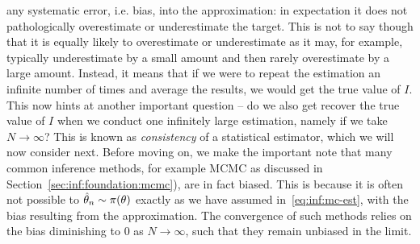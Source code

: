 any systematic error, i.e. bias, into the approximation: in expectation it does not
pathologically overestimate or underestimate the target.  This is not to say though that it is
equally likely to overestimate or underestimate as it may, for example, typically underestimate
by a small amount and then rarely overestimate by a large amount.  Instead, it means that if we
were to repeat the estimation an infinite number of times and average the results, we would
get the true value of $I$.  This now hints at another important question -- do we also get
recover the true value of $I$ when we conduct one infinitely large estimation, namely if we
take $N\rightarrow\infty$?  This is known as \emph{consistency} of a statistical estimator,
which we will now consider next.  Before moving
on, we make the important note that many common \mc inference methods, for example MCMC as
discussed in Section~\ref{sec:inf:foundation:mcmc}), are in fact biased.  
This is because it is often not possible to $\hat{\theta}_n \sim \pi(\theta)$
exactly as we have assumed in~\eqref{eq:inf:mc-est}, with the bias resulting from
the approximation.  The convergence of such methods relies on the bias 
diminishing to $0$ as $N\rightarrow\infty$, such that they remain unbiased in the limit.

